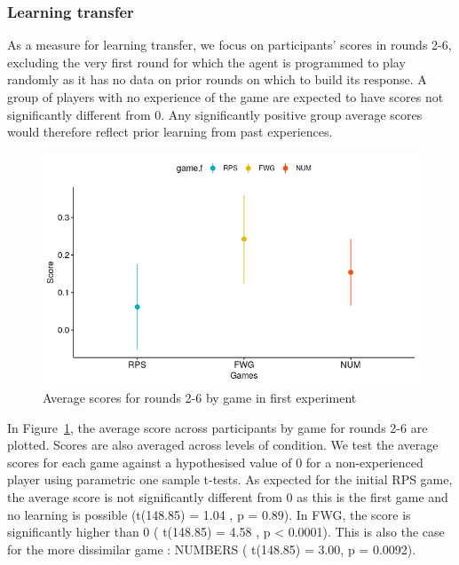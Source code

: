 \documentclass[man,floatsintext]{apa6}
\begin{document}
\hypertarget{learning-transfer}{%
\subsubsection{Learning transfer}\label{learning-transfer}}

As a measure for learning transfer, we focus on participants' scores in rounds 2-6, excluding the very first round for which the agent is programmed to play randomly as it has no data on prior rounds on which to build its response. A group of players with no experience of the game are expected to have scores not significantly different from 0. Any significantly positive group average scores would therefore reflect prior learning from past experiences.

\begin{figure}

{\centering \includegraphics{../Report/images/exp1_early_scor_game} 

}

\caption{Average scores for rounds 2-6 by game in first experiment}\label{fig:exp1-early-score}
\end{figure}

In Figure~\ref{fig:exp1-early-score}, the average score across participants by game for rounds 2-6 are plotted. Scores are also averaged across levels of condition. We test the average scores for each game against a hypothesised value of 0 for a non-experienced player using parametric one sample t-tests. As expected for the initial RPS game, the average score is not significantly different from 0 as this is the first game and no learning is possible (t(148.85) = 1.04 , p = 0.89). In FWG, the score is significantly higher than 0 ( t(148.85) = 4.58 , p \textless{} 0.0001). This is also the case for the more dissimilar game : NUMBERS ( t(148.85) = 3.00, p = 0.0092).
\end{document}
